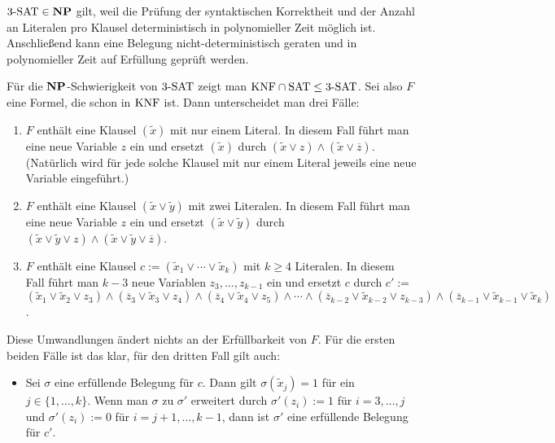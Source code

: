 \begin{Beweis}
    $3\text{-SAT} \in \mathbf{NP}$ gilt, weil die Prüfung der syntaktischen Korrektheit und der Anzahl
    an Literalen pro Klausel deterministisch in polynomieller Zeit möglich ist.
    Anschließend kann eine Belegung nicht-deterministisch geraten und in polynomieller Zeit
    auf Erfüllung geprüft werden.

    Für die $\mathbf{NP}$-Schwierigkeit von $3\text{-SAT}$ zeigt man $\text{KNF} \cap \text{SAT} \le 3\text{-SAT}$.
    Sei also $F$ eine Formel, die schon in $\text{KNF}$ ist.
    Dann unterscheidet man drei Fälle:
    \begin{enumerate}
        \item
        $F$ enthält eine Klausel $(\widetilde{x})$ mit nur einem Literal.
        In diesem Fall führt man eine neue Variable $z$ ein und ersetzt $(\widetilde{x})$ durch
        $(\widetilde{x} \lor z) \land (\widetilde{x} \lor \overline{z})$.
        (Natürlich wird für jede solche Klausel mit nur einem Literal jeweils eine neue
        Variable eingeführt.)

        \item
        $F$ enthält eine Klausel $(\widetilde{x} \lor \widetilde{y})$ mit zwei Literalen.
        In diesem Fall führt man eine neue Variable $z$ ein und ersetzt
        $(\widetilde{x} \lor \widetilde{y})$ durch
        $(\widetilde{x} \lor \widetilde{y} \lor z) \land
        (\widetilde{x} \lor \widetilde{y} \lor \overline{z})$.

        \item
        $F$ enthält eine Klausel $c := (\widetilde{x}_1 \lor \dotsb \lor \widetilde{x}_k)$ mit
        $k \ge 4$ Literalen.
        In diesem Fall führt man $k - 3$ neue Variablen $z_3, \dotsc, z_{k-1}$ ein und ersetzt
        $c$ durch $c' :=$\\
        $(\widetilde{x}_1 \lor \widetilde{x}_2 \lor z_3) \land
        (\overline{z}_3 \lor \widetilde{x}_3 \lor z_4) \land
        (\overline{z}_4 \lor \widetilde{x}_4 \lor z_5) \land \dotsb \land
        (\overline{z}_{k-2} \lor \widetilde{x}_{k-2} \lor z_{k-3}) \land
        (\overline{z}_{k-1} \lor \widetilde{x}_{k-1} \lor \widetilde{x}_k)$.
    \end{enumerate}

    Diese Umwandlungen ändert nichts an der Erfüllbarkeit von $F$.
    Für die ersten beiden Fälle ist das klar, für den dritten Fall gilt auch:
    \begin{itemize}
        \item
        Sei $\sigma$ eine erfüllende Belegung für $c$.
        Dann gilt $\sigma(\widetilde{x}_j) = 1$ für ein $j \in \{1, \dotsc, k\}$.
        Wenn man $\sigma$ zu $\sigma'$ erweitert durch $\sigma'(z_i) := 1$ für $i = 3, \dotsc, j$
        und $\sigma'(z_i) := 0$ für $i = j + 1, \dotsc, k - 1$,
        dann ist $\sigma'$ eine erfüllende Belegung für $c'$.


\end{itemize}
\end{Beweis}
